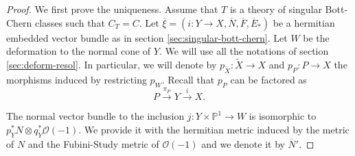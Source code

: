 \documentclass[10pt,twoside]{article}
\numberwithin{equation}{section}
\theoremstyle{plain}
\theoremstyle{definition}
\begin{document}
\begin{proof}
  We first prove the uniqueness. Assume that $T$ is a theory of
  singular Bott-Chern classes such that $C_{T}=C$. Let $\overline
  {\xi}=(i\colon Y\longrightarrow X,\overline N, \overline F, \overline
  E_{\ast})$ be a hermitian embedded vector bundle as in section
  \ref{sec:singular-bott-chern}. Let $W$ be the deformation to the
  normal cone of $Y$. We will use all the notations of section
  \ref{sec:deform-resol}. In particular, we will denote by $p_{\widetilde
    X}\colon \widetilde X\longrightarrow X$ and $p_{P}\colon P\longrightarrow X$
  the morphisms induced by restricting $p_{W}$. Recall that $p_{P}$
  can be factored as
  \begin{displaymath}
    P\overset {\pi _{P}}{\longrightarrow }Y\overset
    {i}{\longrightarrow }X. 
  \end{displaymath}

  The normal vector bundle to the inclusion $j\colon Y\times
  \mathbb{P}^{1}\longrightarrow W$ is isomorphic to
  $p_{Y}^{\ast}N\otimes q_{Y}^{\ast}\mathcal{O}(-1)$. We provide it
  with the hermitian metric induced by the metric of $N$ and the
  Fubini-Study metric of $\mathcal{O}(-1)$ and we denote it by
  $\overline N'$. 


\end{proof}
\end{document}

